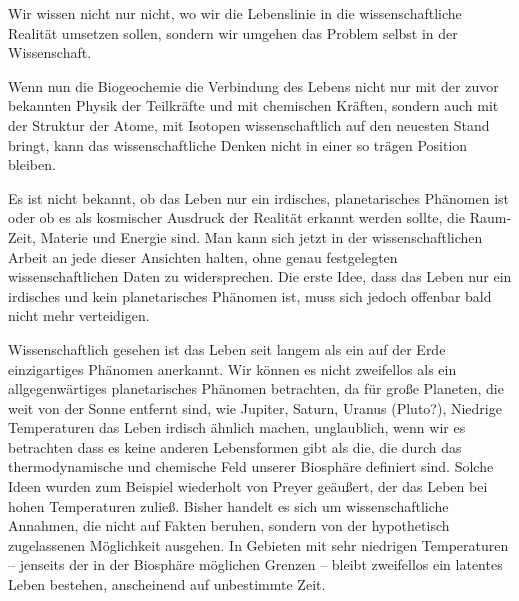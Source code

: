 \documentclass[11pt,a4paper]{book}
\begin{document}
Wir wissen nicht nur nicht, wo wir die Lebenslinie in die wissenschaftliche Realität umsetzen sollen, sondern wir umgehen das Problem selbst in der Wissenschaft.



Wenn nun die Biogeochemie die Verbindung des Lebens nicht nur mit der zuvor bekannten Physik der Teilkräfte und mit chemischen Kräften, sondern auch mit der Struktur der Atome, mit Isotopen wissenschaftlich auf den neuesten Stand bringt, kann das wissenschaftliche Denken nicht in einer so trägen Position bleiben.



Es ist nicht bekannt, ob das Leben nur ein irdisches, planetarisches Phänomen ist oder ob es als kosmischer Ausdruck der Realität erkannt werden sollte, die Raum-Zeit, Materie und Energie sind. Man kann sich jetzt in der wissenschaftlichen Arbeit an jede dieser Ansichten halten, ohne genau festgelegten wissenschaftlichen Daten zu widersprechen. Die erste Idee, dass das Leben nur ein irdisches und kein planetarisches Phänomen ist, muss sich jedoch offenbar bald nicht mehr verteidigen.



Wissenschaftlich gesehen ist das Leben seit langem als ein auf der Erde einzigartiges Phänomen anerkannt. Wir können es nicht zweifellos als ein allgegenwärtiges planetarisches Phänomen betrachten, da für große Planeten, die weit von der Sonne entfernt sind, wie Jupiter, Saturn, Uranus (Pluto?), Niedrige Temperaturen das Leben irdisch ähnlich machen, unglaublich, wenn wir es betrachten dass es keine anderen Lebensformen gibt als die, die durch das thermodynamische und chemische Feld unserer Biosphäre definiert sind. Solche Ideen wurden zum Beispiel wiederholt von Preyer geäußert, der das Leben bei hohen Temperaturen zuließ. Bisher handelt es sich um wissenschaftliche Annahmen, die nicht auf Fakten beruhen, sondern von der hypothetisch zugelassenen Möglichkeit ausgehen. In Gebieten mit sehr niedrigen Temperaturen -- jenseits der in der Biosphäre möglichen Grenzen -- bleibt zweifellos ein latentes Leben bestehen, anscheinend auf unbestimmte Zeit.
\end{document}
